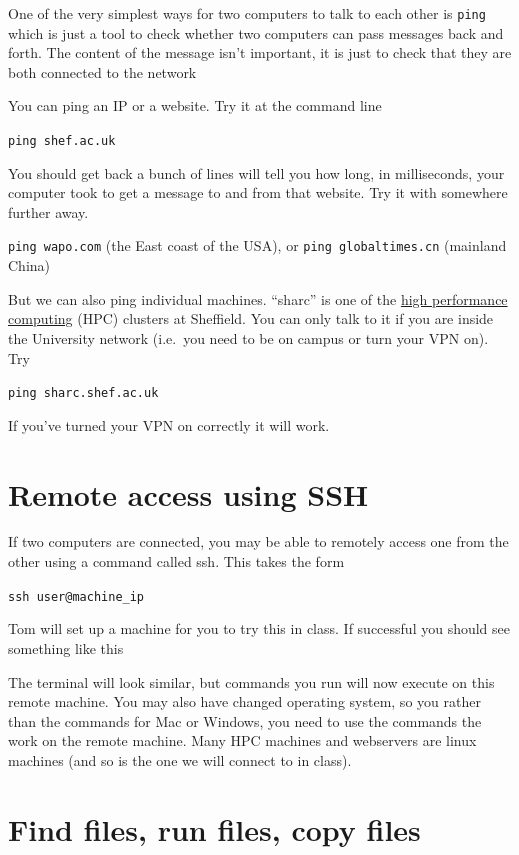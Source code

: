 \documentclass[
]{book}
\begin{document}
One of the very simplest ways for two computers to talk to each other is \texttt{ping} which is just a tool to check whether two computers can pass messages back and forth. The content of the message isn't important, it is just to check that they are both connected to the network

You can ping an IP or a website. Try it at the command line

\texttt{ping\ shef.ac.uk}

You should get back a bunch of lines will tell you how long, in milliseconds, your computer took to get a message to and from that website. Try it with somewhere further away.

\texttt{ping\ wapo.com} (the East coast of the USA), or \texttt{ping\ globaltimes.cn} (mainland China)

But we can also ping individual machines. ``sharc'' is one of the \href{https://docs.hpc.shef.ac.uk/en/latest/}{high performance computing} (HPC) clusters at Sheffield. You can only talk to it if you are inside the University network (i.e.~you need to be on campus or turn your VPN on). Try

\texttt{ping\ sharc.shef.ac.uk}

If you've turned your VPN on correctly it will work.

\hypertarget{remote-access-using-ssh}{%
\section{Remote access using SSH}\label{remote-access-using-ssh}}

If two computers are connected, you may be able to remotely access one from the other using a command called ssh. This takes the form

\texttt{ssh\ user@machine\_ip}

Tom will set up a machine for you to try this in class. If successful you should see something like this

The terminal will look similar, but commands you run will now execute on this remote machine. You may also have changed operating system, so you rather than the commands for Mac or Windows, you need to use the commands the work on the remote machine. Many HPC machines and webservers are linux machines (and so is the one we will connect to in class).

\hypertarget{find-files-run-files-copy-files}{%
\section{Find files, run files, copy files}\label{find-files-run-files-copy-files}}
\end{document}
